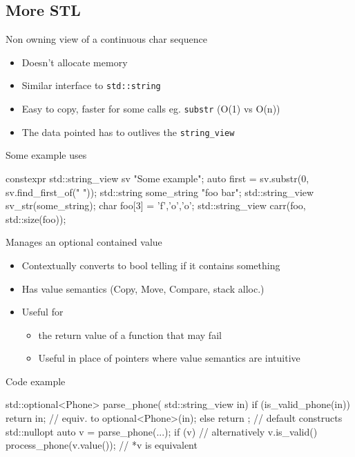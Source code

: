 \subsection{More STL}

\begin{frame}[fragile]
  \begin{block}{Non owning view of a continuous char sequence}
    \begin{itemize}
    \item Doesn't allocate memory
    \item Similar interface to \texttt{std::string}
    \item Easy to copy, faster for some calls eg. \texttt{substr} (O(1) vs O(n))
    \item The data pointed has to outlives the \texttt{string\_view}
    \end{itemize}
  \end{block}
  \begin{exampleblock}{Some example uses}
    \begin{cppcode*}{}
      constexpr std::string_view sv {"Some example"};
      auto first = sv.substr(0, sv.find_first_of(" "));
      std::string some_string {"foo bar"};
      std::string_view sv_str(some_string);
      char foo[3] = {'f','o','o'};
      std::string_view carr(foo, std::size(foo));
    \end{cppcode*}
  \end{exampleblock}
\end{frame}

\begin{frame}[fragile]
  \begin{block}{Manages an optional contained value}
    \begin{itemize}
    \item Contextually converts to bool telling if it contains something
    \item Has value semantics (Copy, Move, Compare, stack alloc.)
    \item Useful for
      \begin{itemize}
        \item the return value of a function that may fail
        \item Useful in place of pointers where value semantics are intuitive
      \end{itemize}
    \end{itemize}
  \end{block}
  \begin{exampleblock}{Code example}
    \small
    \begin{cppcode*}{}
      std::optional<Phone> parse_phone( std::string_view in) {
        if (is_valid_phone(in)) {
          return in;      // equiv. to optional<Phone>(in);
        } else return {}; // default constructs std::nullopt
      }
      auto v = parse_phone(...);
      if (v) {            // alternatively v.is_valid()
        process_phone(v.value()); // *v is equivalent
      }
    \end{cppcode*}
  \end{exampleblock}
\end{frame}

